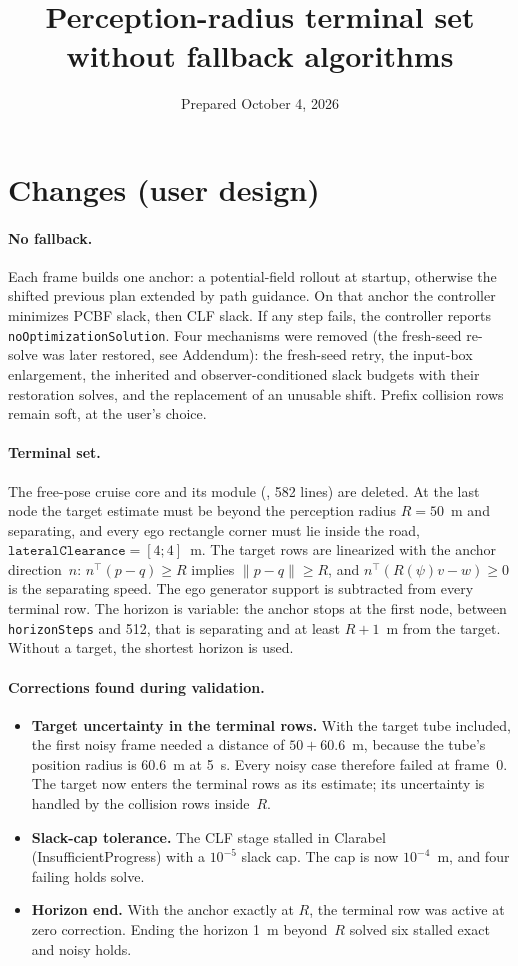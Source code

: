 \documentclass[11pt]{article}
\title{Perception-radius terminal set without fallback algorithms}
\date{Prepared October 4, 2026}
\begin{document}
\maketitle

\section{Changes (user design)}
\paragraph{No fallback.} Each frame builds one anchor: a potential-field rollout
at startup, otherwise the shifted previous plan extended by path guidance. On
that anchor the controller minimizes PCBF slack, then CLF slack. If any step
fails, the controller reports \texttt{noOptimizationSolution}. Four mechanisms
were removed (the fresh-seed re-solve was later restored, see Addendum): the fresh-seed retry, the input-box enlargement, the inherited and
observer-conditioned slack budgets with their restoration solves, and the
replacement of an unusable shift. Prefix collision rows remain soft, at the
user's choice.

\paragraph{Terminal set.} The free-pose cruise core and its module
(, 582 lines) are deleted. At the last node the
target estimate must be beyond the perception radius $R=50$~m and separating,
and every ego rectangle corner must lie inside the road,
$\texttt{lateralClearance}=[4;4]$~m. The target rows are linearized with the
anchor direction~$n$: $n^\top(p-q)\ge R$ implies $\|p-q\|\ge R$, and
$n^\top(R(\psi)v-w)\ge 0$ is the separating speed. The ego generator support is
subtracted from every terminal row. The horizon is variable: the anchor stops at
the first node, between \texttt{horizonSteps} and 512, that is separating and at
least $R+1$~m from the target. Without a target, the shortest horizon is used.

\paragraph{Corrections found during validation.}
\begin{itemize}
\item \textbf{Target uncertainty in the terminal rows.} With the target tube
  included, the first noisy frame needed a distance of $50+60.6$~m, because the
  tube's position radius is 60.6~m at 5~s. Every noisy case therefore failed at
  frame~0. The target now enters the terminal rows as its estimate; its
  uncertainty is handled by the collision rows inside~$R$.
\item \textbf{Slack-cap tolerance.} The CLF stage stalled in Clarabel
  (InsufficientProgress) with a $10^{-5}$ slack cap. The cap is now
  $10^{-4}$~m, and four failing holds solve.
\item \textbf{Horizon end.} With the anchor exactly at $R$, the terminal row was
  active at zero correction. Ending the horizon 1~m beyond~$R$ solved six
  stalled exact and noisy holds.
\end{itemize}
\end{document}
